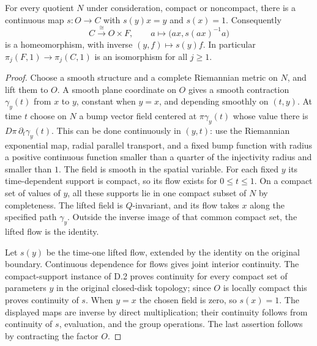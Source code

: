 For every quotient $N$ under consideration, compact or noncompact,
there is a continuous map $s:O\to C$ with $s(y)x=y$ and $s(x)=1$.
Consequently
\[
 C\xrightarrow{\ \cong\ }O\times F,\qquad
 a\longmapsto\bigl(ax,s(ax)^{-1}a\bigr)
\]
is a homeomorphism, with inverse $(y,f)\mapsto s(y)f$.
In particular $\pi_j(F,1)\to\pi_j(C,1)$ is an isomorphism for
all $j\geq1$.
\begin{proof}
Choose a smooth structure and a complete Riemannian metric on $N$,
and lift them to $O$.  A smooth plane coordinate on $O$ gives a
smooth contraction $\gamma_y(t)$ from $x$ to $y$, constant when
$y=x$, and depending smoothly on $(t,y)$.  At time $t$ choose on
$N$ a bump vector field centered at $\pi\gamma_y(t)$ whose value
there is $D\pi\,\partial_t\gamma_y(t)$.  This can be done
continuously in $(y,t)$: use the Riemannian exponential map, radial
parallel transport, and a fixed bump function with radius a positive
continuous function smaller than a quarter of the injectivity
radius and smaller than $1$.  The field is smooth in the spatial
variable.  For each fixed $y$ its time-dependent support is compact,
so its flow exists for $0\leq t\leq1$.  On a compact set of values
of $y$, all these supports lie in one compact subset of $N$ by
completeness.  The lifted field is $Q$-invariant, and its flow takes
$x$ along the specified path $\gamma_y$.  Outside the inverse image
of that common compact set, the lifted flow is the identity.

Let $s(y)$ be the time-one lifted flow, extended by the identity on
the original boundary.  Continuous dependence for flows gives
joint interior continuity.  The compact-support instance of D.2
proves continuity for every compact set of parameters $y$ in the
original closed-disk topology; since $O$ is locally compact this
proves continuity of $s$.  When $y=x$ the chosen field is zero, so
$s(x)=1$.  The displayed maps are inverse by direct multiplication;
their continuity follows from continuity of $s$, evaluation, and
the group operations.  The last assertion follows by contracting
the factor $O$.
\end{proof}

